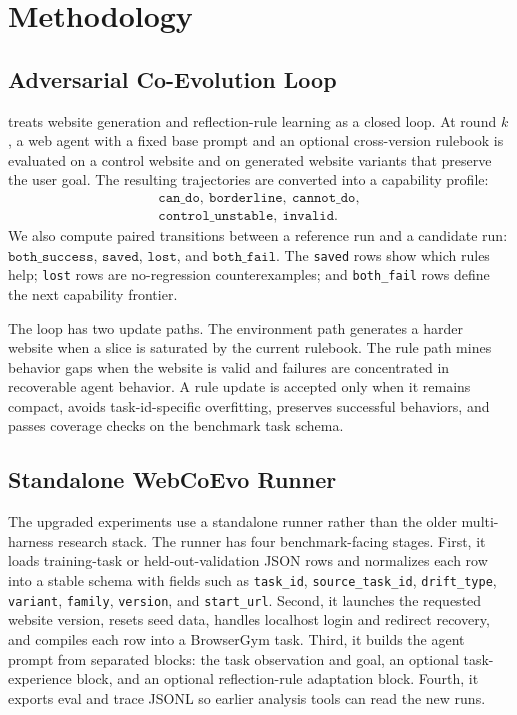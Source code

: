 \section{Methodology}

\subsection{Adversarial Co-Evolution Loop}

\webcoevo{} treats website generation and reflection-rule learning as a closed loop. At round \(k\), a web agent with a fixed base prompt and an optional cross-version rulebook is evaluated on a control website and on generated website variants that preserve the user goal. The resulting trajectories are converted into a capability profile:
\[
\begin{gathered}
\texttt{can\_do},\ \texttt{borderline},\ \texttt{cannot\_do},\\
\texttt{control\_unstable},\ \texttt{invalid}.
\end{gathered}
\]
We also compute paired transitions between a reference run and a candidate run:
\(\texttt{both\_success}\), \(\texttt{saved}\), \(\texttt{lost}\), and \(\texttt{both\_fail}\). The \texttt{saved} rows show which rules help; \texttt{lost} rows are no-regression counterexamples; and \texttt{both\_fail} rows define the next capability frontier.

The loop has two update paths. The environment path generates a harder website when a slice is saturated by the current rulebook. The rule path mines behavior gaps when the website is valid and failures are concentrated in recoverable agent behavior. A rule update is accepted only when it remains compact, avoids task-id-specific overfitting, preserves successful behaviors, and passes coverage checks on the benchmark task schema.

\subsection{Standalone WebCoEvo Runner}

The upgraded experiments use a standalone \linkding{} runner rather than the older multi-harness research stack. The runner has four benchmark-facing stages. First, it loads training-task or held-out-validation JSON rows and normalizes each row into a stable schema with fields such as \texttt{task\_id}, \texttt{source\_task\_id}, \texttt{drift\_type}, \texttt{variant}, \texttt{family}, \texttt{version}, and \texttt{start\_url}. Second, it launches the requested website version, resets seed data, handles localhost login and redirect recovery, and compiles each row into a BrowserGym task. Third, it builds the agent prompt from separated blocks: the task observation and goal, an optional \expel{} task-experience block, and an optional reflection-rule adaptation block. Fourth, it exports eval and trace JSONL so earlier analysis tools can read the new runs.

